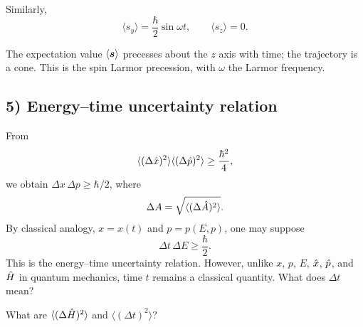 Similarly,
\begin{equation}
\langle s_y\rangle=\frac{\hbar}{2}\sin\omega t,\qquad\langle s_z\rangle=0.
\end{equation}
\begin{center}
\end{center}
The expectation value $\langle\bm{s}\rangle$ precesses about the $z$ axis with time; the trajectory is a cone. This is the spin Larmor precession, with $\omega$ the Larmor frequency.



\subsection*{5) Energy--time uncertainty relation}
From
\begin{equation}
\langle(\Delta\hat{x})^2\rangle\langle(\Delta\hat{p})^2\rangle\ge\frac{\hbar^2}{4},
\end{equation}
we obtain $\Delta x\,\Delta p\ge\hbar/2$, where
\begin{equation}
\Delta A=\sqrt{\langle(\Delta\hat{A})^2\rangle}.
\end{equation}
By classical analogy, $x=x(t)$ and $p=p(E,p)$, one may suppose
\begin{equation}
\Delta t\,\Delta E\ge\frac\hbar2.
\end{equation}
This is the energy--time uncertainty relation. However, unlike $x$, $p$, $E$, $\hat{x}$, $\hat{p}$, and $\hat{H}$ in quantum mechanics, time $t$ remains a classical quantity. What does $\Delta t$ mean?

What are $\langle(\Delta\hat{H})^2\rangle$ and $\langle(\Delta t)^2\rangle$?

